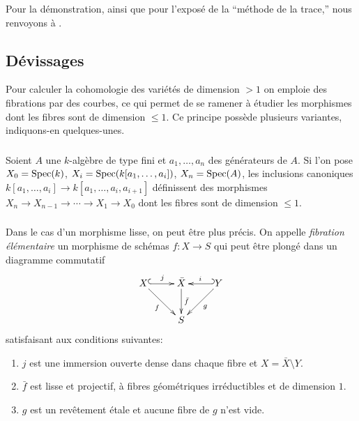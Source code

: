 \documentclass[oneside]{book}
\begin{document}
Pour la démonstration, ainsi que pour l'exposé de la ``méthode de la 
trace,'' nous renvoyons à \cite[IX 5]{4}.










\subsection{Dévissages}\label{I:3-4}

Pour calculer la cohomologie des variétés de dimension $>1$ on emploie des 
fibrations par des courbes, ce qui permet de se ramener à étudier les 
morphismes dont les fibres sont de dimension $\leqslant 1$. Ce principe 
possède plusieurs variantes, indiquons-en quelques-unes.





\subsubsection{}\label{I:3-4-1}

Soient $A$ une $k$-algèbre de type fini et $a_1,\dotsc,a_n$ des générateurs de 
$A$. Si l'on pose $X_0=\operatorname{Spec}(k)$, $X_i=\operatorname{Spec}(k[a_1,\dotsc,a_i])$, 
$X_n=\operatorname{Spec}(A)$, les inclusions canoniques 
$k[a_1,\dotsc,a_i]\to k[a_1,\dotsc,a_i,a_{i+1}]$ définissent des morphismes 
$X_n \to X_{n-1} \to \cdots \to X_1 \to X_0$ dont les fibres sont de dimension 
$\leqslant 1$. 





\subsubsection{}\label{I:3-4-2}

Dans le cas d'un morphisme lisse, on peut être plus précis. On appelle 
\emph{fibration élémentaire} un morphisme de schémas $f:X\to S$ qui peut 
être plongé dans un diagramme commutatif
\[\xymatrix{
  X \ar@{^{(}->}[r]^-j \ar[dr]_-f
    & \bar X \ar[d]^-{\bar f}
    & \ar@{_{(}->}[l]_-i \ar[dl]^-g Y \\
  & S
}\]
satisfaisant aux conditions suivantes:
\begin{enumerate}[\indent i)]
  \item $j$ est une immersion ouverte dense dans chaque fibre et 
    $X=\bar X \setminus Y$. 
  \item $\bar f$ est lisse et projectif, à fibres géométriques 
    irréductibles et de dimension $1$.
  \item $g$ est un revêtement étale et aucune fibre de $g$ n'est vide.
\end{enumerate}
\end{document}
